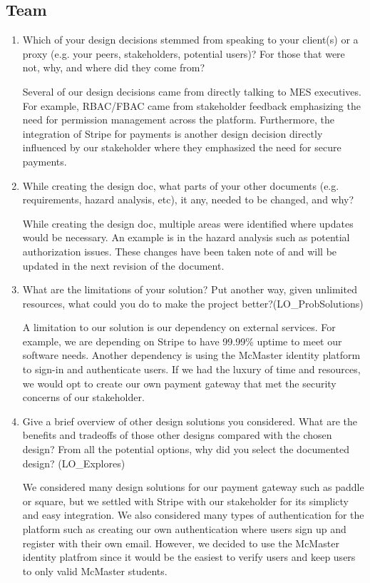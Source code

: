 \documentclass[12pt, titlepage]{article}
\begin{document}
\subsection{Team}

\begin{enumerate}
  \item Which of your design decisions stemmed from speaking to your client(s)
  or a proxy (e.g. your peers, stakeholders, potential users)? For those that
  were not, why, and where did they come from?

    Several of our design decisions came from directly talking to MES executives. For example, RBAC/FBAC came from stakeholder feedback emphasizing the need for permission management across the platform. Furthermore, the integration of Stripe for payments is another design decision directly influenced by our stakeholder where they emphasized the need for secure payments. 
  
  \item While creating the design doc, what parts of your other documents (e.g.
  requirements, hazard analysis, etc), it any, needed to be changed, and why?

    While creating the design doc, multiple areas were identified where updates would be necessary. An example is in the hazard analysis such as potential authorization issues. These changes have been taken note of and will be updated in the next revision of the document.
  
  \item What are the limitations of your solution?  Put another way, given
  unlimited resources, what could you do to make the project better?(LO\_ProbSolutions)

    A limitation to our solution is our dependency on external services. For example, we are depending on Stripe to have 99.99\% uptime to meet our software needs. Another dependency is using the McMaster identity platform to sign-in and authenticate users. If we had the luxury of time and resources, we would opt to create our own payment gateway that met the security concerns of our stakeholder.
  
  \item Give a brief overview of other design solutions you considered.  What
  are the benefits and tradeoffs of those other designs compared with the chosen
  design?  From all the potential options, why did you select the documented design?
  (LO\_Explores)

    We considered many design solutions for our payment gateway such as paddle or square, but we settled with Stripe with our stakeholder for its simplicty and easy integration. We also considered many types of authentication for the platform such as creating our own authentication where users sign up and register with their own email. However, we decided to use the McMaster identity platfrom since it would be the easiest to verify users and keep users to only valid McMaster students.

  \end{enumerate}
\end{document}
